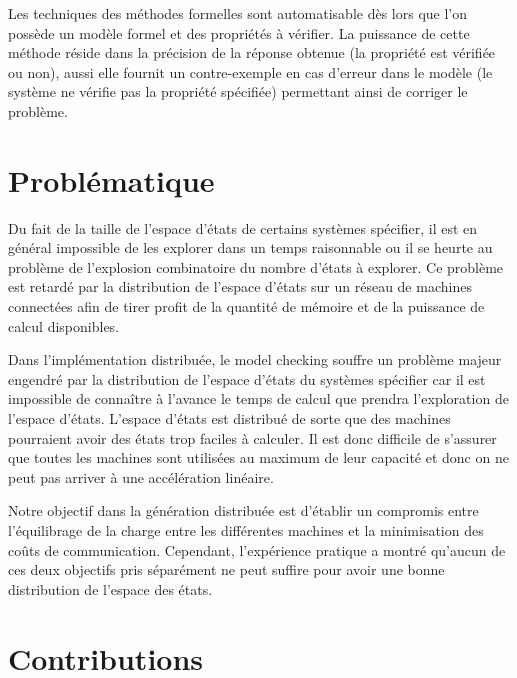 Les techniques des méthodes formelles sont automatisable dès lors que l’on possède un modèle formel et des propriétés à vérifier. La puissance de cette méthode réside dans la précision de la réponse obtenue (la propriété est vérifiée ou non),  aussi elle fournit un contre-exemple en cas d’erreur dans le modèle (le système ne vérifie pas la propriété spécifiée) permettant ainsi de corriger le problème.

\section{Problématique}
Du fait de la taille de l'espace d'états de certains systèmes spécifier, il est en général impossible de les explorer dans un temps raisonnable ou il se heurte au problème de l'explosion combinatoire du nombre d'états à explorer. Ce problème est retardé par la distribution de l'espace d'états sur un réseau de machines connectées afin de tirer profit de la quantité de mémoire et de la puissance de calcul disponibles.

Dans l’implémentation distribuée, le model checking souffre un problème majeur engendré par la distribution de l'espace d'états du systèmes spécifier car il est impossible de connaître à l’avance le temps de calcul que prendra l’exploration de l'espace d'états. L'espace d'états est distribué de sorte que des machines pourraient avoir des états trop faciles à calculer. Il est donc difficile de s’assurer que toutes les machines sont utilisées au maximum de
leur capacité et donc on ne peut pas arriver à une accélération linéaire.

Notre objectif dans la génération distribuée est d’établir un compromis entre l’équilibrage de la charge entre les différentes machines et la minimisation des coûts de communication. Cependant, l’expérience pratique a montré qu’aucun de ces deux objectifs pris séparément ne peut suffire pour avoir une bonne distribution de l’espace des états.

\section{Contributions}

